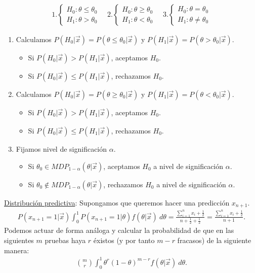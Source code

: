 \begin{align*}
   1. \begin{cases}
        H_0 : \theta \leq \theta_0 \\
        H_1 : \theta > \theta_0
    \end{cases} \quad     2.\begin{cases}
        H_0 : \theta \ge \theta_0 \\
        H_1 : \theta < \theta_0
    \end{cases} \quad     3.\begin{cases}
        H_0 : \theta = \theta_0 \\
        H_1 : \theta \not = \theta_0
    \end{cases}
\end{align*}

\begin{enumerate}
    \item Calculamos $P(H_0 | \vec{x}) = P(\theta \leq \theta_0 |\vec{x})$ y $P(H_1 | \vec{x}) = P(\theta > \theta_0 | \vec{x})$.
    \begin{itemize}
        \item Si $P(H_0 | \vec{x}) > P(H_1 | \vec{x})$, aceptamos $H_0$.
        \item Si $P(H_0 | \vec{x}) \leq P(H_1 | \vec{x})$, rechazamos $H_0$.
    \end{itemize}
        \item Calculamos $P(H_0 | \vec{x}) = P(\theta \ge \theta_0 |\vec{x})$ y $P(H_1 | \vec{x}) = P(\theta < \theta_0 | \vec{x})$.
    \begin{itemize}
        \item Si $P(H_0 | \vec{x}) > P(H_1 | \vec{x})$, aceptamos $H_0$.
        \item Si $P(H_0 | \vec{x}) \leq P(H_1 | \vec{x})$, rechazamos $H_0$.
    \end{itemize}
    \item Fijamos nivel de significación $\alpha$.
    \begin{itemize}
        \item Si $\theta_0 \in MDP_{1 - \alpha}(\theta | \vec{x})$, aceptamos $H_0$ a nivel de significación $\alpha$.
        \item Si $\theta_0 \not\in MDP_{1 - \alpha}(\theta | \vec{x})$, rechazamos $H_0$ a nivel de significación $\alpha$.
    \end{itemize}
\end{enumerate}
\noindent \underline{Distribución predictiva}: Supongamos que queremos hacer una predicción $x_{n+1}$.
\begin{align*}
     P(x_{n+1} = 1 | \vec{x}) \int_{0}^{1} P(x_{n+1} = 1 | \theta) f(\theta | \vec{x}) \ d\theta = \frac{\sum_{i=1}^{n} x_i + \frac{1}{2}}{n+\frac{1}{2} + \frac{1}{2}} = \frac{\sum_{i=1}^{n} x_i + \frac{1}{2}}{n+1}.
\end{align*}
Podemos actuar de forma análoga y calcular la probabilidad de que en las siguientes $m$ pruebas haya $r$ éxistos (y por tanto $m-r$ fracasos) de la siguiente manera:
\begin{align*}
  \binom{m}{r} \int_{0}^{1} \theta^r(1 - \theta)^{m-r} f(\theta | \vec{x}) \ d\theta.
\end{align*}

